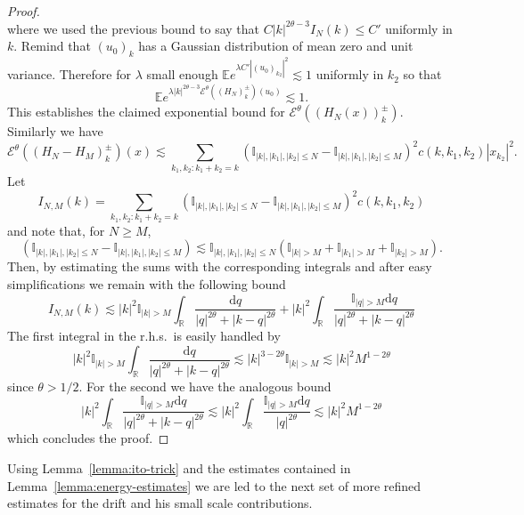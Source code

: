 \documentclass[11pt,a4paper,reqno]{amsart}
\newcommand{\II}{\mathbb{I}}
\newcommand{\RR}{\mathbb{R}}
\newcommand{\expect}{\mathbb{E}}
\newcommand{\cE}{\mathcal{E}}
\newcommand{\dd}{\mathrm{d}}
\begin{document}
\begin{proof}
$$$$
where we used the previous bound to say that $C|k|^{2\theta-3} I_N(k) \le C'$ uniformly in $k$. Remind that $(u_0)_k$ has a Gaussian distribution of mean zero and unit variance. Therefore for $\lambda$ small enough $\expect e^{\lambda C'|(u_0)_{k_2}|^2}\lesssim 1$ uniformly in $k_2$ so that  
$$
\expect e^{\lambda |k|^{2\theta-3}\cE^\theta((H_N)^\pm_k)(u_0)} \lesssim 1.
$$
This establishes the claimed exponential bound for $\cE^\theta((H_N(x))_k^\pm)$. 
Similarly we have
$$
\cE^\theta((H_N-H_M)^\pm_k)(x)  \lesssim \sum_{k_1,k_2 :k_1+k_2=k} (\II_{|k|,|k_1|,|k_2|\le N}-\II_{|k|,|k_1|,|k_2|\le M})^2 c(k,k_1,k_2) | x_{k_2}|^2 .
 $$
Let
$$
I_{N,M}(k) =\sum_{k_1,k_2 :k_1+k_2=k} (\II_{|k|,|k_1|,|k_2|\le N}-\II_{|k|,|k_1|,|k_2|\le M})^2 c(k,k_1,k_2)
$$
and note that, for $N\ge M$,
$$
(\II_{|k|,|k_1|,|k_2|\le N}-\II_{|k|,|k_1|,|k_2|\le M}) \lesssim \II_{|k|,|k_1|,|k_2|\le N}(\II_{|k|> M}+\II_{|k_1|> M}+\II_{|k_2|> M}).
$$
Then, by estimating the sums with the corresponding integrals and after easy simplifications we remain with the following bound
$$
I_{N,M}(k)\lesssim |k|^{2} \II_{|k|> M} \int_{\RR} \frac{\dd q}{|q|^{2\theta}+|k-q|^{2\theta}} 
+ |k|^{2}  \int_{\RR} \frac{\II_{|q|> M}\dd q}{|q|^{2\theta}+|k-q|^{2\theta}} 
$$
The first integral in the r.h.s.~is easily handled by
$$
|k|^{2} \II_{|k|> M} \int_{\RR} \frac{\dd q}{|q|^{2\theta}+|k-q|^{2\theta}} \lesssim |k|^{3-2\theta} \II_{|k|> M} \lesssim |k|^2 M^{1-2\theta}
$$
since $\theta > 1/2$. For the second we have the analogous bound
$$
|k|^{2}  \int_{\RR} \frac{\II_{|q|> M}\dd q}{|q|^{2\theta}+|k-q|^{2\theta}} \lesssim 
|k|^{2}  \int_{\RR} \frac{\II_{|q|> M}\dd q}{|q|^{2\theta}} \lesssim |k|^2 M^{1-2\theta}
$$
which concludes the proof.
\end{proof}

Using Lemma~\ref{lemma:ito-trick} and the estimates contained in Lemma~\ref{lemma:energy-estimates} we are led to the next set of more refined estimates for the drift and his small scale contributions.
\end{document}
